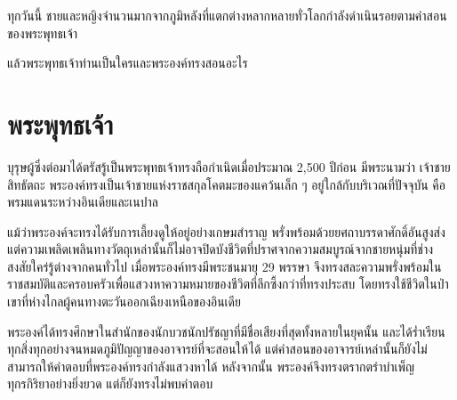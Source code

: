 \documentclass[12pt, openany]{book}
\begin{document}
ทุก{\wbr}วัน{\wbr}นี้ ชาย{\wbr}และ{\wbr}หญิง{\wbr}จําน{\wbr}วน{\wbr}มาก{\wbr}จาก{\wbr}ภูมิ{\wbr}หลัง{\wbr}ที่{\wbr}แตก{\wbr}ต่าง{\wbr}หลากหลาย{\wbr}ทั่ว{\wbr}โลก{\wbr}กํา{\wbr}ลัง{\wbr}ดำเนิน{\wbr}รอย{\wbr}ตาม{\wbr}คํา{\wbr}สอน{\wbr}ของ{\wbr}พระพุทธเจ้า 

แล้ว{\wbr}พระพุทธเจ้า{\wbr}ท่าน{\wbr}เป็น{\wbr}ใคร{\wbr}และ{\wbr}พระองค์{\wbr}ทรง{\wbr}สอน{\wbr}อะไร{\wbr}

\mainmatter

\pagestyle{fancy}


\chapter*{พระพุทธเจ้า}


บุรุษ{\wbr}ผู้{\wbr}ซึ่ง{\wbr}ต่อ{\wbr}มา{\wbr}ได้{\wbr}ตรัสรู้{\wbr}เป็น{\wbr}พระพุทธเจ้า{\wbr}ทรง{\wbr}ถือ{\wbr}กำเนิด{\wbr}เมื่อ{\wbr}ประมาณ 2,500 ปี{\wbr}ก่อน มี{\wbr}พระ{\wbr}นาม{\wbr}ว่า เจ้า{\wbr}ชาย{\wbr}สิทธัตถะ  พระองค์{\wbr}ทรง{\wbr}เป็น{\wbr}เจ้า{\wbr}ชาย{\wbr}แห่ง{\wbr}ราชสกุล{\wbr}โคตมะ{\wbr}ของ{\wbr}แคว้น{\wbr}เล็ก ๆ อยู่{\wbr}ใกล้{\wbr}กับ{\wbr}บริเวณ{\wbr}ที่{\wbr}ปัจจุบัน คือ พรมแดน{\wbr}ระหว่าง{\wbr}อินเดีย{\wbr}และ{\wbr}เนปาล  

แม้{\wbr}ว่า{\wbr}พระองค์{\wbr}จะ{\wbr}ทรง{\wbr}ได้{\wbr}รับ{\wbr}การ{\wbr}เลี้ยงดู{\wbr}ให้{\wbr}อยู่{\wbr}อย่าง{\wbr}เกษม{\wbr}สำราญ พรั่งพร้อม{\wbr}ด้วย{\wbr}ยศ{\wbr}ถา{\wbr}บรรดาศักดิ์{\wbr}อัน{\wbr}สูงส่ง แต่{\wbr}ความ{\wbr}เพลิดเพลิน{\wbr}ทาง{\wbr}วัตถุ{\wbr}เหล่า{\wbr}นั้น{\wbr}ก็{\wbr}ไม่{\wbr}อาจ{\wbr}ปิดบัง{\wbr}ชีวิต{\wbr}ที่{\wbr}ปราศจาก{\wbr}ความ{\wbr}สมบูรณ์{\wbr}จาก{\wbr}ชาย{\wbr}หนุ่ม{\wbr}ที่{\wbr}ช่าง{\wbr}สงสัย{\wbr}ใคร่{\wbr}รู้{\wbr}ต่าง{\wbr}จาก{\wbr}คน{\wbr}ทั่วไป  เมื่อ{\wbr}พระองค์{\wbr}ทรง{\wbr}มี{\wbr}พระ{\wbr}ชนมายุ 29 พรรษา จึง{\wbr}ทรง{\wbr}สละ{\wbr}ความ{\wbr}พรั่งพร้อม{\wbr}ใน{\wbr}ราชสมบัติ{\wbr}และ{\wbr}ครอบครัว{\wbr}เพื่อ{\wbr}แสวง{\wbr}หา{\wbr}ความหมาย{\wbr}ของ{\wbr}ชีวิต{\wbr}ที่{\wbr}ลึกซึ้ง{\wbr}กว่า{\wbr}ที่{\wbr}ทรง{\wbr}ประสบ โดย{\wbr}ทรง{\wbr}ใช้{\wbr}ชีวิต{\wbr}ใน{\wbr}ป่า{\wbr}เขา{\wbr}ที่{\wbr}ห่าง{\wbr}ไกล{\wbr}ผู้คน{\wbr}ทาง{\wbr}ตะวัน{\wbr}ออก{\wbr}เฉียง{\wbr}เหนือ{\wbr}ของ{\wbr}อินเดีย  

พระองค์{\wbr}ได้{\wbr}ทรง{\wbr}ศึกษา{\wbr}ใน{\wbr}สำนัก{\wbr}ของ{\wbr}นักบวช{\wbr}นัก{\wbr}ปรัชญา{\wbr}ที่{\wbr}มี{\wbr}ชื่อเสียง{\wbr}ที่สุด{\wbr}ทั้งหลาย{\wbr}ใน{\wbr}ยุค{\wbr}นั้น และ{\wbr}ได้{\wbr}ร่ำเรียน{\wbr}ทุก{\wbr}สิ่ง{\wbr}ทุก{\wbr}อย่าง{\wbr}จน{\wbr}หมด{\wbr}ภูมิปัญญา{\wbr}ของ{\wbr}อาจารย์{\wbr}ที่{\wbr}จะ{\wbr}สอน{\wbr}ให้ ได้ แต่{\wbr}คำ{\wbr}สอน{\wbr}ของ{\wbr}อาจารย์{\wbr}เหล่า{\wbr}นั้น{\wbr}ก็{\wbr}ยัง{\wbr}ไม่{\wbr}สามารถ{\wbr}ให้{\wbr}คำ{\wbr}ตอบ{\wbr}ที่{\wbr}พระองค์{\wbr}ทรง{\wbr}กำลัง{\wbr}แสวง{\wbr}หา{\wbr}ได้  หลัง{\wbr}จาก{\wbr}นั้น พระองค์{\wbr}จึง{\wbr}ทรง{\wbr}ตรากตรำ{\wbr}บำเพ็ญ{\wbr}ทุกรกิริยา{\wbr}อย่าง{\wbr}ยิ่งยวด แต่{\wbr}ก็{\wbr}ยัง{\wbr}ทรง{\wbr}ไม่{\wbr}พบ{\wbr}คำ{\wbr}ตอบ 
\end{document}
